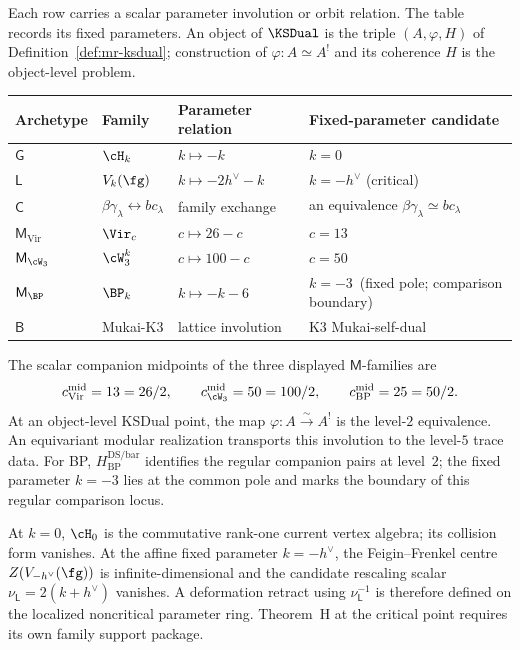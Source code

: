\begin{remark}
\label{rem:ksdual-fixed-points-bucket}
%
Each row carries a scalar parameter involution or orbit relation.  The
table records its fixed parameters.  An object of $\KSDual$ is the
triple $(A,\varphi,H)$ of Definition~\ref{def:mr-ksdual}; construction
of $\varphi\colon A\simeq A^!$ and its coherence $H$ is the
object-level problem.
\begin{center}
\renewcommand{\arraystretch}{1.25}
\begin{tabular}{@{}llll@{}}
\toprule
Archetype & Family & Parameter relation & Fixed-parameter candidate\\
\midrule
$\mathsf G$ & $\cH_k$ & $k\mapsto -k$ & $k = 0$\\
$\mathsf L$ & $V_k(\fg)$ & $k\mapsto -2h^\vee - k$ & $k = -h^\vee$ \textup{(}critical\textup{)}\\
$\mathsf C$ & $\beta\gamma_\lambda \leftrightarrow bc_\lambda$ & family exchange &
an equivalence $\beta\gamma_\lambda\simeq bc_\lambda$\\
$\mathsf M_{\mathrm{Vir}}$ & $\Vir_c$ & $c\mapsto 26 - c$ & $c = 13$\\
$\mathsf M_{\cW_3}$ & $\cW_3^k$ & $c\mapsto 100 - c$ & $c = 50$\\
$\mathsf M_{\BP}$ & $\BP_k$ & $k\mapsto -k - 6$ &
$k=-3$ \,\textup{(}fixed pole; comparison boundary\textup{)}\\
$\mathsf B$ & Mukai-K3 & lattice involution & K3 Mukai-self-dual\\
\bottomrule
\end{tabular}
\end{center}
The scalar companion midpoints of the three displayed
$\mathsf M$-families are
\[
c^{\mathrm{mid}}_{\mathrm{Vir}}=13=26/2,
\qquad
c^{\mathrm{mid}}_{\cW_3}=50=100/2,
\qquad
c^{\mathrm{mid}}_{\mathrm{BP}}=25=50/2.
\]
At an object-level KSDual point, the map
$\varphi\colon A\xrightarrow{\sim}A^!$ is the level-$2$ equivalence.
An equivariant modular realization transports this involution to the
level-$5$ trace data.
For BP, $H_{\mathrm{BP}}^{\mathrm{DS/bar}}$ identifies the regular
companion pairs at level~$2$; the fixed parameter $k=-3$ lies at the
common pole and marks the boundary of this regular comparison locus.

At $k=0$, $\cH_0$ is the commutative rank-one current vertex algebra;
its collision form vanishes.  At the affine fixed parameter
$k=-h^\vee$, the Feigin--Frenkel centre
$Z(V_{-h^\vee}(\fg))$ is infinite-dimensional and the candidate
rescaling scalar $\nu_{\mathsf L}=2(k+h^\vee)$ vanishes.  A
deformation retract using $\nu_{\mathsf L}^{-1}$ is therefore defined
on the localized noncritical parameter ring.  Theorem~H at the
critical point requires its own family support package.


\end{remark}

